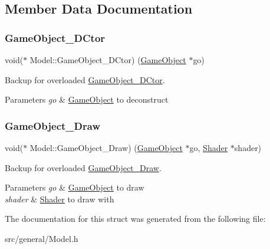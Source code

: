 \subsection{Member Data Documentation}
\mbox{\label{struct_model_a84a8aa41fa533f08e9eda7d657f0e389}} 
\subsubsection{\texorpdfstring{GameObject\_DCtor}{GameObject\_DCtor}}
{\footnotesize\ttfamily void($\ast$ Model\+::\+Game\+Object\+\_\+\+D\+Ctor) (\mbox{\hyperlink{struct_game_object}{Game\+Object}} $\ast$go)}



Backup for overloaded \mbox{\hyperlink{struct_model_a84a8aa41fa533f08e9eda7d657f0e389}{Game\+Object\+\_\+\+D\+Ctor}}. 


\begin{DoxyParams}{Parameters}
{\em go} & \mbox{\hyperlink{struct_game_object}{Game\+Object}} to deconstruct \\
\hline
\end{DoxyParams}
\mbox{\label{struct_model_aecd30a10f690702cf87061f719bb152b}} 
\subsubsection{\texorpdfstring{GameObject\_Draw}{GameObject\_Draw}}
{\footnotesize\ttfamily void($\ast$ Model\+::\+Game\+Object\+\_\+\+Draw) (\mbox{\hyperlink{struct_game_object}{Game\+Object}} $\ast$go, \mbox{\hyperlink{struct_shader}{Shader}} $\ast$shader)}



Backup for overloaded \mbox{\hyperlink{struct_model_aecd30a10f690702cf87061f719bb152b}{Game\+Object\+\_\+\+Draw}}. 


\begin{DoxyParams}{Parameters}
{\em go} & \mbox{\hyperlink{struct_game_object}{Game\+Object}} to draw \\
\hline
{\em shader} & \mbox{\hyperlink{struct_shader}{Shader}} to draw with \\
\hline
\end{DoxyParams}


The documentation for this struct was generated from the following file\+:\begin{DoxyCompactItemize}
\item 
src/general/Model.\+h\end{DoxyCompactItemize}
